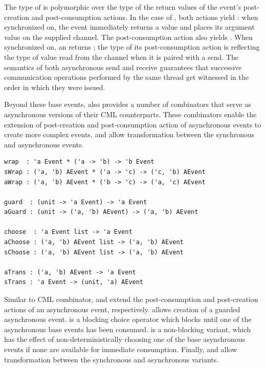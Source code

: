 The type of  is polymorphic over the type of the return values of
the event's post-creation and post-consumption actions.  In the case of
, both actions yield : when synchronized on, the event
immediately returns a  value and places its  argument value on
the supplied channel. The post-consumption action also yields . When
synchronized on, an  returns ; the type of its
post-consumption action is  reflecting the type of value read from the
channel when it is paired with a send. The semantics of both asynchronous send
and receive guarantees that successive communication operations performed by
the same thread get witnessed in the order in which they were issued.

Beyond these base events, \acml also provides a number of combinators that
serve as asynchronous versions of their CML counterparts. These combinators
enable the extension of post-creation and post-consumption action of
asynchronous events to create more complex events, and allow transformation
between the synchronous and asynchronous events.
\vspace{2mm}

\lstset{numbers=none}
\begin{lstlisting}
wrap  : 'a Event * ('a -> 'b) -> 'b Event
sWrap : ('a, 'b) AEvent * ('a -> 'c) -> ('c, 'b) AEvent
aWrap : ('a, 'b) AEvent * ('b -> 'c) -> ('a, 'c) AEvent

guard  : (unit -> 'a Event) -> 'a Event
aGuard : (unit -> ('a, 'b) AEvent) -> ('a, 'b) AEvent

choose  : 'a Event list -> 'a Event
aChoose : ('a, 'b) AEvent list -> ('a, 'b) AEvent
sChoose : ('a, 'b) AEvent list -> ('a, 'b) AEvent

aTrans : ('a, 'b) AEvent -> 'a Event
sTrans : 'a Event -> (unit, 'a) AEvent
\end{lstlisting}

Similar to CML  combinator,  and  extend the
post-consumption and post-creation actions of an asynchronous event,
respectively.  allows creation of a guarded asynchronous event.
 is a blocking choice operator which blocks until one of the
asynchronous base events has been consumed.  is a non-blocking
variant, which has the effect of non-deterministically choosing one of the base
asynchronous events if none are available for immediate consumption. Finally,
 and  allow transformation between the synchronous and
asynchronous variants.
\vspace{5mm}

